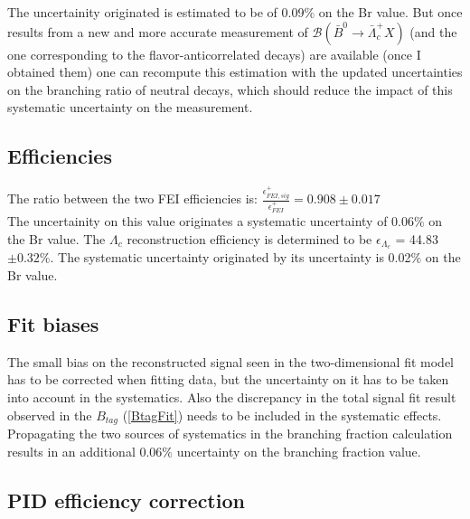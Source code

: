 The uncertainity originated is estimated to be of 0.09$\%$ on the Br value. 
But once results from a new and more accurate measurement of $\mathcal{B}(\bar{B}^0 \rightarrow \bar{\Lambda}_c^+ X)$ (and the one corresponding to the flavor-anticorrelated decays) are available (once I obtained them) 
one can recompute this estimation with the updated uncertainties on the branching ratio of neutral decays, which should reduce the impact of this systematic uncertainty on the measurement.

\subsection{Efficiencies} 
 
The ratio between the two FEI efficiencies is: 
 $\frac{\epsilon^{+}_{FEI,  sig}}{\epsilon^{+}_{FEI}} = 0.908 \pm 0.017 $ \\
\vspace{0.4 cm} 
 The uncertainity on this value originates a systematic uncertainty of 0.06$\%$ on the Br value.
The $\Lambda_c$ reconstruction efficiency is determined to be $\epsilon_{\Lambda_c}$ = 44.83 $\pm 0.32 \%$. The systematic uncertainty originated by its uncertainty is 0.02$\%$ on the Br value.

\subsection{Fit biases}

The small bias on the reconstructed signal seen in the two-dimensional fit model has to be corrected when fitting data, but the uncertainty on it has to be taken into account in the systematics. Also the discrepancy in the total signal fit result observed in the $B_{tag}$ (\cref{BtagFit}) needs to be included in the systematic effects.
Propagating the two sources of systematics in the branching fraction calculation results in an additional 0.06$\%$ uncertainty on the branching fraction value. 

\subsection{PID  efficiency correction}\label{sec:chargedCorrPIDcorrSys}

